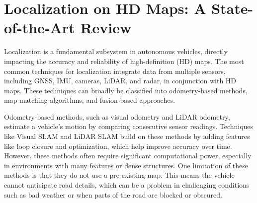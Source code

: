 \section{Localization on HD Maps: A State-of-the-Art Review}

Localization is a fundamental subsystem in autonomous vehicles, directly impacting the accuracy and reliability of high-definition (HD) maps. The most common techniques for localization integrate data from multiple sensors, including GNSS, IMU, cameras, LiDAR, and radar, in conjunction with HD maps. These techniques can broadly be classified into odometry-based methods, map matching algorithms, and fusion-based approaches.

Odometry-based methods, such as visual odometry and LiDAR odometry, estimate a vehicle's motion by comparing consecutive sensor readings. Techniques like Visual SLAM \cite{10353965} and LiDAR SLAM \cite{9707054} build on these methods by adding features like loop closure and optimization, which help improve accuracy over time. However, these methods often require significant computational power, especially in environments with many features or dense structures. One limitation of these methods is that they do not use a pre-existing map. This means the vehicle cannot anticipate road details, which can be a problem in challenging conditions such as bad weather or when parts of the road are blocked or obscured.

